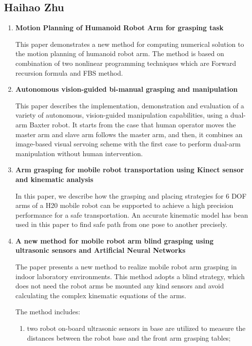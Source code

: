 \documentclass[10pt,twocolumn,letterpaper]{article}
\begin{document}
\subsection{Haihao Zhu}

\begin{enumerate}
\item \textbf{Motion Planning of Humanoid Robot Arm for grasping task} \cite{4516345}

This paper demonstrates a new method for computing numerical solution to the motion planning of humanoid robot arm. The method is based on combination of two nonlinear programming techniques which are Forward recursion formula and FBS method. 

\item \textbf{Autonomous vision-guided bi-manual grasping and manipulation} \cite{8025192}

This paper describes the implementation, demonstration and evaluation of a variety of autonomous, vision-guided manipulation capabilities, using a dual-arm Baxter robot. It starts from the case that human operator  moves the master arm and slave arm follows the master arm, and then, it combines an image-based visual servoing scheme with the first case to perform dual-arm manipulation without human intervention. 
  
\item \textbf{Arm grasping for mobile robot transportation using Kinect sensor and kinematic analysis} \cite{7151321}

In this paper, we describe how the grasping and placing strategies for 6 DOF arms of a H20 mobile robot can be supported to achieve a high precision performance for a safe transportation. An accurate kinematic model has bean used in this paper to find safe path from one pose to another precisely.

\item \textbf{A new method for mobile robot arm blind grasping using ultrasonic sensors and Artificial Neural Networks} \cite{6739654}

The paper presents a new method to realize mobile robot arm grasping in indoor laboratory environments. This
method adopts a blind strategy, which does not need the robot arms be mounted any kind sensors and avoid calculating the complex kinematic equations of the arms.

The method includes:
\begin{enumerate}
\item two robot on-board ultrasonic sensors in base are utilized to measure the distances between the robot base and the front arm grasping tables; 


\end{enumerate}
\end{enumerate}
\end{document}
